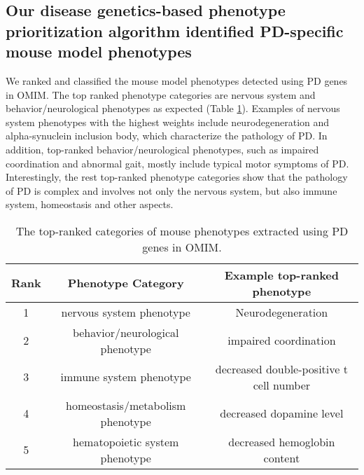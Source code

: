 \subsection{Our disease genetics-based phenotype prioritization algorithm identified PD-specific mouse model phenotypes }
 We ranked and classified the mouse model phenotypes detected using PD genes in OMIM. The top ranked phenotype categories are nervous system and behavior/neurological phenotypes as expected (Table \ref{mphenPD}). Examples of nervous system phenotypes with the highest weights include neurodegeneration and alpha-synuclein inclusion body, which characterize the pathology of PD. In addition, top-ranked behavior/neurological phenotypes, such as impaired coordination and abnormal gait, mostly include typical motor symptoms of PD. Interestingly, the rest top-ranked phenotype categories show that the pathology of PD is complex and involves not only the nervous system, but also immune system, homeostasis and other aspects.  \begin{table}[h!]
\caption{The top-ranked categories of mouse phenotypes extracted using PD genes in OMIM.}
  \label{mphenPD}
  \centering
      \begin{tabular}{ccc}
        \hline
         Rank  &Phenotype Category   &Example top-ranked phenotype\\ \hline
         1	&nervous system phenotype&	Neurodegeneration\\
2	&behavior/neurological phenotype	&impaired coordination\\
3	&immune system phenotype	&decreased double-positive t cell number\\
4	&homeostasis/metabolism phenotype	&decreased dopamine level\\
5	&hematopoietic system phenotype	&decreased hemoglobin content\\
\hline
\end{tabular}
\end{table}

